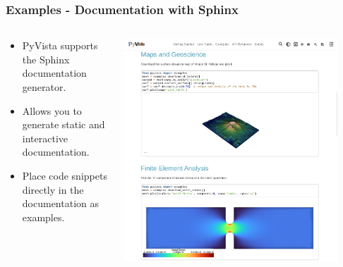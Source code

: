 \documentclass[t]{beamer}
\renewcommand{\small}{\footnotesize}
\renewcommand{\footnotesize}{\scriptsize}
\begin{document}
\begin{frame}
    \frametitle{Examples - Documentation with Sphinx}

    \begin{center}
        \begin{columns}[T]
            \begin{column}{.5\textwidth}
                \small
                \begin{itemize}[leftmargin=10pt, label=•]
                    \item PyVista supports the Sphinx documentation generator.
                    \item Allows you to generate static and interactive documentation.
                    \item Place code snippets directly in the documentation as examples.
                \end{itemize}
                \vspace{40pt}
                \inputminted[fontsize=\footnotesize]{bash}{code/sphinx_conf.py}
            \end{column}

            \begin{column}{.5\textwidth}
                \vspace{-5pt}
                \centering
                \href{https://docs.pyvista.org/}{\includegraphics[width=0.9\textwidth]{figures/sphinx.png}}
            \end{column}
        \end{columns}
    \end{center}

\end{frame}
\end{document}
